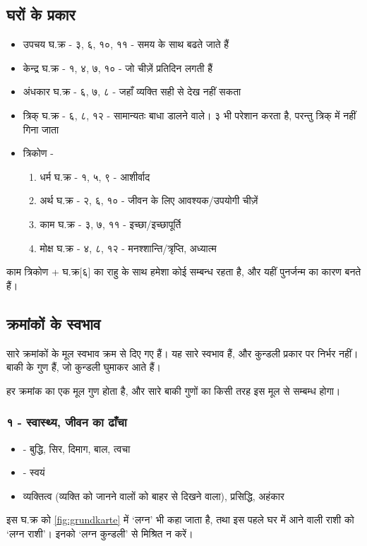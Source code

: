 \subsection[वर्गीकरण]{घरों के प्रकार} \label{subsec:hausart}
\begin{itemize}
    \item उपचय घ.क्र - ३, ६, १०, ११ - समय के साथ बढते जाते हैं
    \item केन्द्र घ.क्र - १, ४, ७, १० - जो चीज़ें प्रतिदिन लगती हैं
    \item अंधकार घ.क्र - ६, ७, ८ - जहाँ व्यक्ति सही से देख नहीं सकता
    \item त्रिक् घ.क्र - ६, ८, १२ - सामान्यतः बाधा  डालने वाले। ३ भी परेशान करता है, परन्तु त्रिक् में नहीं गिना जाता
    \item त्रिकोण - \begin{enumerate}
        \item धर्म घ.क्र - १, ५, ९ - आशीर्वाद
        \item अर्थ घ.क्र - २, ६, १० - जीवन के लिए आवश्यक/उपयोगी चीज़ें
        \item काम घ.क्र - ३, ७, ११ - इच्छा/इच्छापूर्ति
        \item मोक्ष घ.क्र - ४, ८, १२ - मनश्शान्ति/त्रृप्ति, अध्यात्म
    \end{enumerate}
\end{itemize}
काम त्रिकोण + घ.क्र[६] का राहु के साथ हमेशा कोई सम्बन्ध रहता है, और यहीं पुनर्जन्म का कारण बनते हैं।
\subsection[घर गुण]{क्रमांकों के स्वभाव} \label{subsec:hauszahlverhalten}
सारे क्रमांकों के मूल स्वभाव क्रम से दिए गए हैं। यह सारे स्वभाव  हैं, और कुन्डली प्रकार पर निर्भर नहीं। बाकी के गुण  हैं, जो कुन्डली घुमाकर आते हैं।

हर क्रमांक का एक मूल गुण होता है, और सारे बाकी गुणों का किसी तरह इस मूल से सम्बम्ध होगा।
\subsubsection{१ - स्वास्थ्य, जीवन का ढाँचा}
\begin{itemize}
    \item {} - बुद्धि, सिर, दिमाग, बाल, त्वचा
    \item {} - स्वयं
    \item व्यक्तित्व (व्यक्ति को जानने वालों को बाहर से दिखने वाला), प्रसिद्धि, अहंकार
\end{itemize}
इस घ.क्र को \autoref{fig:grundkarte} में `लग्न' भी कहा जाता है, तथा इस पहले घर में आने वाली राशी को `लग्न राशी'। इनको `लग्न कुन्डली' से मिश्रित न करें।
